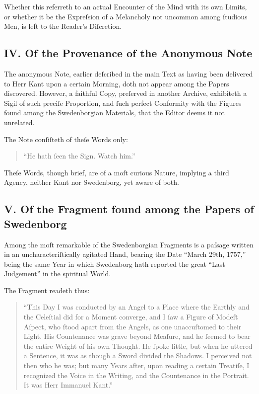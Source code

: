 \documentclass[12pt]{article}
\begin{document}
Whether this referreth to an actual Encounter of the Mind with its own 
Limits, or whether it be the Expreſsion of a Melancholy not uncommon among 
ſtudious Men, is left to the Reader’s Diſcretion.

\subsection*{IV. Of the Provenance of the Anonymous Note}
The anonymous Note, earlier deſcribed in the main Text as having been delivered 
to Herr Kant upon a certain Morning, doth not appear among the Papers 
discovered. However, a faithful Copy, preſerved in another Archive, exhibiteth 
a Sigil of such preciſe Proportion, and ſuch perfect Conformity with the 
Figures found among the Swedenborgian Materials, that the Editor deems it not 
unrelated.

The Note conſiſteth of theſe Words only:

\begin{quote}
\small
“He hath ſeen the Sign. Watch him.”
\end{quote}

Theſe Words, though brief, are of a moſt curious Nature, implying a third 
Agency, neither Kant nor Swedenborg, yet aware of both.

\subsection*{V. Of the Fragment found among the Papers of Swedenborg}
Among the moſt remarkable of the Swedenborgian Fragments is a paſsage written 
in an uncharacteriſtically agitated Hand, bearing the Date “March 29th, 1757,” 
being the same Year in which Swedenborg hath reported the great “Last 
Judgement” in the spiritual World.

The Fragment readeth thus:

\begin{quote}
\small
“This Day I was conducted by an Angel to a Place where the Earthly and the 
Celeſtial did for a Moment converge, and I ſaw a Figure of Modeſt Aſpect, who 
ſtood apart from the Angels, as one unaccuſtomed to their Light. His Countenance 
was grave beyond Meaſure, and he ſeemed to bear the entire Weight of his own 
Thought. He ſpoke little, but when he uttered a Sentence, it was as though a 
Sword divided the Shadows. I perceived not then who he was; but many Years 
after, upon reading a certain Treatiſe, I recognized the Voice in the Writing, 
and the Countenance in the Portrait. It was Herr Immanuel Kant.”
\end{quote}
\end{document}
